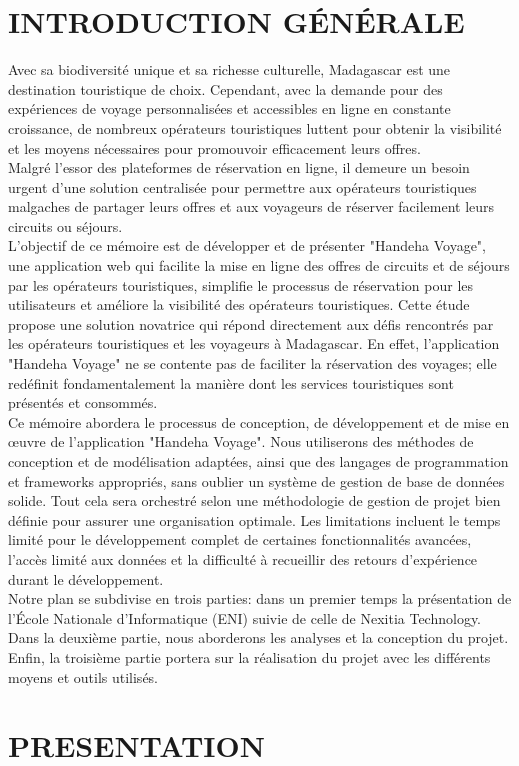 \documentclass[12pt]{report}
\begin{document}
			\chapter*{INTRODUCTION GÉNÉRALE}
			\begin{minipage}{\textwidth}
				\hspace{15pt} Avec sa biodiversité unique et sa richesse culturelle, Madagascar est une destination touristique de choix. Cependant, avec la demande pour des expériences de voyage personnalisées et accessibles en ligne en constante croissance, de nombreux opérateurs touristiques luttent pour obtenir la visibilité et les moyens nécessaires pour promouvoir efficacement leurs offres.\\

				\hspace{15pt} Malgré l'essor des plateformes de réservation en ligne, il demeure un besoin urgent d'une solution centralisée pour permettre aux opérateurs touristiques malgaches de partager leurs offres et aux voyageurs de réserver facilement leurs circuits ou séjours.\\

				\hspace{15pt} L'objectif de ce mémoire est de développer et de présenter "Handeha Voyage", une application web qui  facilite la mise en ligne des offres de circuits et de séjours par les opérateurs touristiques, simplifie le processus de réservation pour les utilisateurs et améliore la visibilité des opérateurs touristiques. Cette étude propose une solution novatrice qui répond directement aux défis rencontrés par les opérateurs touristiques et les voyageurs à Madagascar. En effet, l'application "Handeha Voyage" ne se contente pas de faciliter la réservation des voyages; elle redéfinit fondamentalement la manière dont les services touristiques sont présentés et consommés.\\

				\hspace{15pt} Ce mémoire abordera le processus de conception, de développement et de mise en œuvre de l'application "Handeha Voyage". Nous utiliserons des méthodes de conception et de modélisation adaptées, ainsi que des langages de programmation et frameworks appropriés, sans oublier un système de gestion de base de données solide. Tout cela sera orchestré selon une méthodologie de gestion de projet bien définie pour assurer une organisation optimale. Les limitations incluent le temps limité pour le développement complet de certaines fonctionnalités avancées, l'accès limité aux données et la difficulté à recueillir des retours d'expérience durant le développement.\\

				\hspace{15pt} Notre plan se subdivise en trois parties: dans un premier temps la présentation de l’École Nationale d'Informatique (ENI) suivie de celle de Nexitia Technology. Dans la deuxième partie, nous aborderons les analyses et la conception du projet. Enfin, la troisième partie portera sur la réalisation du projet avec les différents moyens et outils utilisés.
			\end{minipage}
			\newpage
			\chapter{PRESENTATION}
\end{document}
